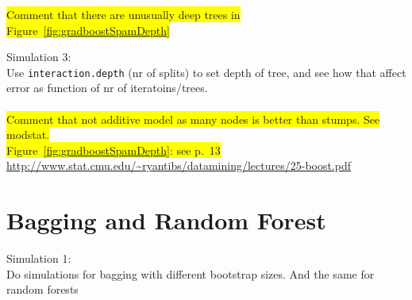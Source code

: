 \colorbox{yellow}{Comment that there are unusually deep trees in Figure~\ref{fig:gradboostSpamDepth}}

Simulation 3:\\
Use \verb+interaction.depth+ (nr of splits) to set depth of tree, and see how that affect error as function of nr of iteratoins/trees.\\
\\ \colorbox{yellow}{Comment that not additive model as many nodes is better than stumps. See modstat.}
\\ \colorbox{yellow}{Figure~\ref{fig:gradboostSpamDepth}: see p.~13} \url{http://www.stat.cmu.edu/~ryantibs/datamining/lectures/25-boost.pdf}\\


\section{Bagging and Random Forest}
\label{sec:BaggandRFSim}
Simulation 1: \\
Do simulations for bagging with different bootstrap sizes. And the same for random forests\\
\\
